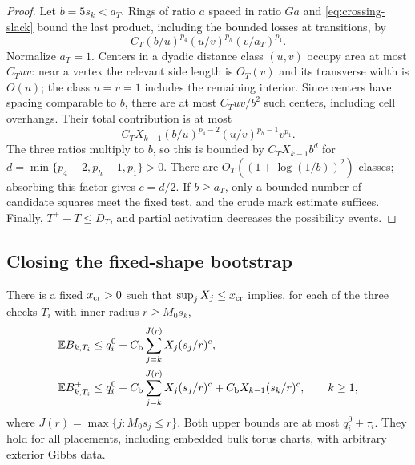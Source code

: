 \begin{proof}
Let $b=5s_k<a_T$.  Rings of ratio $a$ spaced in ratio $Ga$ and
\eqref{eq:crossing-slack} bound the last product, including the bounded
losses at transitions, by
\[
 C_T(b/u)^{p_4}(u/v)^{p_h}(v/a_T)^{p_1}.
\]
Normalize $a_T=1$.  Centers in a dyadic distance class $(u,v)$ occupy
area at most $C_Tuv$: near a vertex the relevant side length is $O_T(v)$
and its transverse width is $O(u)$; the class $u=v=1$ includes the
remaining interior.  Since centers have spacing comparable to $b$,
there are at most $C_Tuv/b^2$ such centers, including cell overhangs.
Their total contribution is at most
\[
 C_TX_{k-1}(b/u)^{p_4-2}(u/v)^{p_h-1}v^{p_1}.
\]
The three ratios multiply to $b$, so this is bounded by
$C_TX_{k-1}b^d$ for $d=\min\{p_4-2,p_h-1,p_1\}>0$.
There are $O_T((1+\log(1/b))^2)$ classes; absorbing this factor gives
$c=d/2$.  If $b\geq a_T$, only a bounded number of candidate squares
meet the fixed test, and the crude mark estimate suffices.  Finally,
$T^+-T\leq D_T$, and partial activation decreases the possibility events.
\end{proof}

\subsection{Closing the fixed-shape bootstrap}

\begin{lemma}
\label{lem:crossing-bootstrap}
There is a fixed $x_{\rm cr}>0$ such that $\sup_jX_j\leq x_{\rm cr}$
implies, for each of the three checks $T_i$ with inner radius
$r\geq M_0s_k$,
\begin{align}
 \mathbb E B_{k,T_i}
 &\leq q_i^0+C_{\rm b}\sum_{j=k}^{J(r)}X_j(s_j/r)^c,
 \label{eq:crossing-bootstrap-plain}\\
 \mathbb E B^+_{k,T_i}
 &\leq q_i^0+C_{\rm b}\sum_{j=k}^{J(r)}X_j(s_j/r)^c
               +C_{\rm b}X_{k-1}(s_k/r)^c,\qquad k\geq1,
 \label{eq:crossing-bootstrap-possible}
\end{align}
where $J(r)=\max\{j:M_0s_j\leq r\}$.  Both upper bounds are at most
$q_i^0+\tau_i$.  They hold for all placements, including embedded bulk
torus charts, with arbitrary exterior Gibbs data.
\end{lemma}

